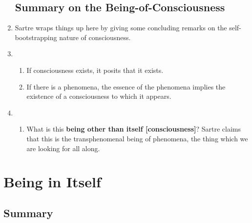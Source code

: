 \begin{enumerate}
  \subsection{Summary on the Being-of-Consciousness}
  \item Sartre wraps things up here by giving some concluding remarks on the self-bootstrapping nature of consciousness.
  \item {}
  \begin{enumerate}
    \item If consciousness exists, it posits that it exists.
    \item If there is a phenomena, the essence of the phenomena implies the existence of a consciousness to which it appears.
  \end{enumerate}
  \item {}
  \begin{enumerate}
    \item What is this \textbf{being other than itself [consciousness]}? Sartre claims that this is the transphenomenal being of phenomena, the thing which we are looking for all along.
  \end{enumerate}
\end{enumerate}

\section{Being in Itself}
\subsection*{Summary}

